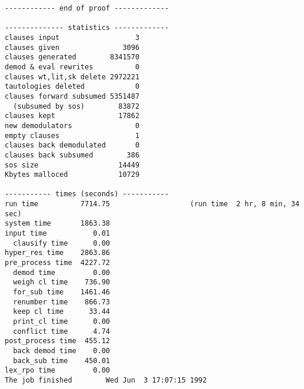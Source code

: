 {\begin{verbatim}
------------ end of proof -------------

-------------- statistics -------------
clauses input                  3
clauses given               3096
clauses generated        8341570
demod & eval rewrites          0
clauses wt,lit,sk delete 2972221
tautologies deleted            0
clauses forward subsumed 5351487
  (subsumed by sos)        83872
clauses kept               17862
new demodulators               0
empty clauses                  1
clauses back demodulated       0
clauses back subsumed        386
sos size                   14449
Kbytes malloced            10729

----------- times (seconds) -----------
run time          7714.75                   (run time  2 hr, 8 min, 34 sec)
system time       1863.38
input time           0.01
  clausify time      0.00
hyper_res time    2863.86
pre_process time  4227.72
  demod time         0.00
  weigh cl time    736.90
  for_sub time    1461.46
  renumber time    866.73
  keep cl time      33.44
  print_cl time      0.00
  conflict time      4.74
post_process time  455.12
  back demod time    0.00
  back_sub time    450.01
lex_rpo time         0.00
The job finished        Wed Jun  3 17:07:15 1992
\end{verbatim} }
